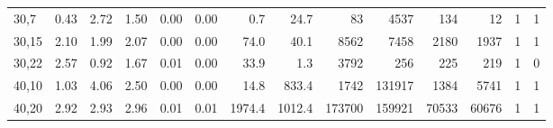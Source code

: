 \documentclass[smallextended]{svjour3hack}       %
\begin{document}
\begin{table}[!ht]
\begin{tabular}{l|rrr|rr|rr|rr|rr|rr}
30,7                                                & 0.43                              & 2.72                         & 1.50                     & 0.00                              & 0.00                          & 0.7                               & 24.7                          & 83                                 & 4537                          & 134                                     & 12                                 & 1                                 & 1                            \\
30,15                                               & 2.10                              & 1.99                         & 2.07                     & 0.00                              & 0.00                          & 74.0                              & 40.1                          & 8562                               & 7458                          & 2180                                    & 1937                               & 1                                 & 1                            \\
30,22                                               & 2.57                              & 0.92                         & 1.67                     & 0.01                              & 0.00                          & 33.9                              & 1.3                           & 3792                               & 256                           & 225                                     & 219                                & 1                                 & 0                            \\ \hline
40,10                                               & 1.03                              & 4.06                         & 2.50                     & 0.00                              & 0.00                          & 14.8                              & 833.4                         & 1742                               & 131917                        & 1384                                    & 5741                               & 1                                 & 1                            \\
40,20                                               & 2.92                              & 2.93                         & 2.96                     & 0.01                              & 0.01                          & 1974.4                            & 1012.4                        & 173700                             & 159921                        & 70533                                   & 60676                              & 1                                 & 1                            \\

\end{tabular}
\end{table}
\end{document}
